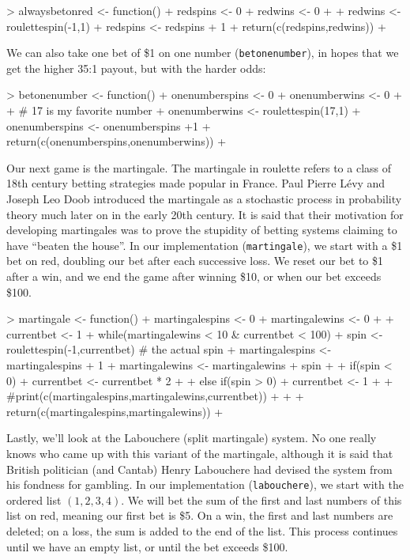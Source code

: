 \documentclass[10pt, oneside, reqno]{article}
\theoremstyle{plain}
\begin{document}
\begin{Schunk}
\begin{Sinput}
> alwaysbetonred <- function(){
+ 	redspins <- 0
+ 	redwins <- 0
+ 
+ 	redwins <- roulettespin(-1,1)
+ 	redspins <- redspins + 1
+ 	return(c(redspins,redwins))
+ 	}
\end{Sinput}
\end{Schunk}

We can also take one bet of \$1 on one number ({\tt betonenumber}), in hopes that we get the higher 35:1 payout, but with the harder odds:

\begin{Schunk}
\begin{Sinput}
> betonenumber <- function(){
+ 	onenumberspins <- 0
+ 	onenumberwins <- 0
+ 	
+ 	# 17 is my favorite number
+ 	onenumberwins <- roulettespin(17,1)
+ 	onenumberspins <- onenumberspins +1
+ 	return(c(onenumberspins,onenumberwins))
+ 	}
\end{Sinput}
\end{Schunk}

Our next game is the martingale. The martingale in roulette refers to a class of 18th century betting strategies made popular in France. Paul Pierre L\'{e}vy and Joseph Leo Doob introduced the martingale as a stochastic process in probability theory much later on in the early 20th century. It is said that their motivation for developing martingales was to prove the stupidity of betting systems claiming to have ``beaten the house''. In our implementation ({\tt martingale}), we start with a \$1 bet on red, doubling our bet after each successive loss. We reset our bet to \$1 after a win, and we end the game after winning \$10, or when our bet exceeds \$100.

\begin{Schunk}
\begin{Sinput}
> martingale <- function(){
+ 	martingalespins <- 0
+ 	martingalewins <- 0
+ 	
+ 	currentbet <- 1
+ 	while(martingalewins < 10 & currentbet < 100){
+ 		spin <- roulettespin(-1,currentbet) # the actual spin
+ 		martingalespins <- martingalespins + 1
+ 		martingalewins <- martingalewins + spin
+ 		
+ 		if(spin < 0){
+ 			currentbet <- currentbet * 2}
+ 			
+ 		else if(spin > 0){
+ 			currentbet <- 1}
+ 		
+ 		#print(c(martingalespins,martingalewins,currentbet))
+ 		}
+ 		
+ 	return(c(martingalespins,martingalewins))
+ 	}
\end{Sinput}
\end{Schunk}

Lastly, we'll look at the Labouchere (split martingale) system. No one really knows who came up with this variant of the martingale, although it is said that British politician (and Cantab) Henry Labouchere had devised the system from his fondness for gambling. In our implementation ({\tt labouchere}), we start with the ordered list $(1,2,3,4)$. We will bet the sum of the first and last numbers of this list on red, meaning our first bet is \$5. On a win, the first and last numbers are deleted; on a loss, the sum is added to the end of the list. This process continues until we have an empty list, or until the bet exceeds \$100.
\end{document}
